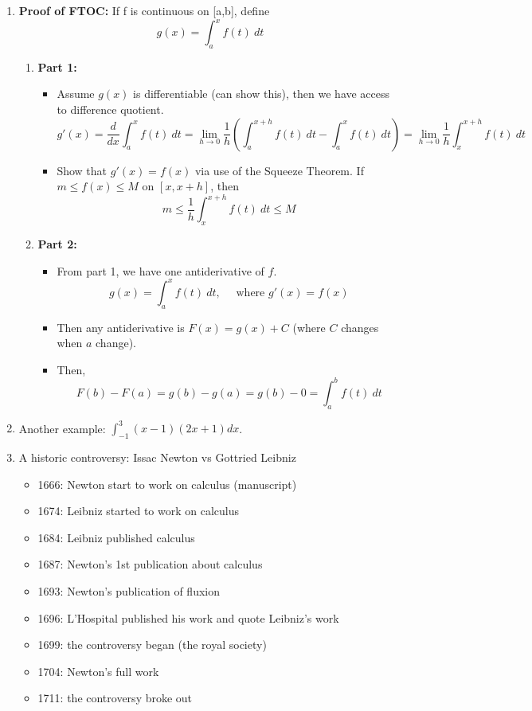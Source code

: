 \documentclass{article}
\begin{document}
\begin{enumerate}
\item {\bf Proof of FTOC:} If f is continuous on [a,b], define
$$
g(x) = \int_a^x f(t)~dt
$$
\begin{enumerate}
\item {\bf Part 1:}
\begin{itemize}
\item Assume $g(x)$ is differentiable (can show this), then we have access to difference quotient.
\[ 
g'(x) = \frac{d}{dx} \int_a^x f(t)~dt = \lim_{h\rightarrow 0} \frac{1}{h}  \left(\int_a^{x+h} f(t)~dt - \int_a^x f(t)~dt \right) = \lim_{h\rightarrow 0} \frac{1}{h} \int_x^{x+h} f(t)~dt
\]
\item Show that $g'(x) = f(x)$ via use of the Squeeze Theorem. If $m\leq f(x) \leq M$ on $[x,x+h]$, then
\[
m \leq \frac{1}{h} \int_x^{x+h} f(t)~dt \leq M
\]
\end{itemize}
\item {\bf Part 2:}
\begin{itemize}
\item From part 1, we have one antiderivative of $f$.
\[
g(x) = \int_a^x f(t)~dt, \quad \text{ where } g'(x) = f(x)
\]
\item Then any antiderivative is $F(x) = g(x)+C$ (where $C$ changes when $a$ change).
\item Then, 
$$
F(b)-F(a) = g(b) - g(a) = g(b) - 0 = \int_a^b f(t)~dt
$$
\end{itemize}
\end{enumerate}


\item Another example: $\displaystyle \int_{-1}^3 (x-1)(2x+1) dx
$.

\item A historic controversy: Issac Newton vs Gottried Leibniz
\begin{itemize}
\item 1666: Newton start to work on calculus (manuscript)
\item 1674: Leibniz started to work on calculus
\item 1684: Leibniz published calculus
\item 1687: Newton's 1st publication about calculus
\item 1693: Newton's publication of fluxion
\item 1696: L'Hospital published his work and quote Leibniz's work
\item 1699: the controversy began (the royal society)
\item 1704: Newton's full work
\item 1711: the controversy broke out
\end{itemize}

\end{enumerate}
\end{document}
